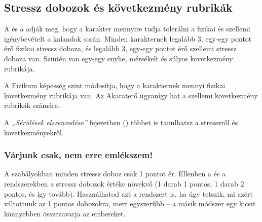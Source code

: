 \subsection{Stressz dobozok és következmény rubrikák}

A  és a  adják meg, hogy a karakter mennyire tudja tolerálni a fizikai és szellemi igénybevételt a kalandok során. Minden karakternek legalább 3, egy‑egy pontot érő fizikai stressz doboza, és legalább 3, egy‑egy pontot érő szellemi stressz doboza van. Szintén van egy‑egy enyhe, mérsékelt és súlyos következmény rubrikája.

A Fizikum képesség szint módosítja, hogy a karakternek mennyi fizikai következmény rubrikája van. Az Akaraterő ugyanígy hat a szellemi következmény rubrikák számára.

\begin{center}
\end{center}

A \textit{„Sérülések elszenvedése”} fejezetben () többet is tanulhatsz a stresszről és következményekről.

\subsubsection{Várjunk csak, nem erre emlékszem!}

A  szabályokban minden stressz doboz csak 1 pontot ér. Ellenben a  és a  rendszerekben a stressz dobozok értéke növekvő (1 darab 1 pontos, 1 darab 2 pontos, és így tovább). Használhatod azt a rendszert is, ha úgy tetszik; mi azért váltottunk az 1 pontos dobozokra, mert egyszerűbb – a másik módszer egy kicsit könnyebben összezavarja az embereket.

